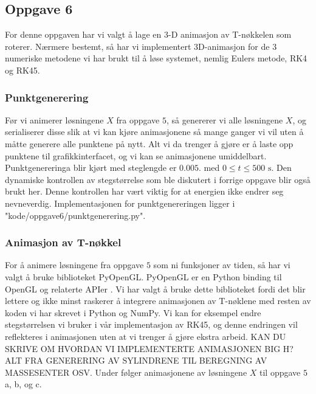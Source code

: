 \subsection{Oppgave 6}
For denne oppgaven har vi valgt å lage en 3-D animasjon av T-nøkkelen som roterer. Nærmere bestemt, så har vi implementert 3D-animasjon for de $3$ numeriske metodene vi har brukt til å løse systemet, nemlig Eulers metode, RK4 og RK45.

\subsubsection{Punktgenerering}
Før vi animerer løsningene $X$ fra oppgave $5$, så genererer vi alle løsningene $X$, og serialiserer disse slik at vi kan kjøre animasjonene så mange ganger vi vil uten å måtte generere alle punktene på nytt. Alt vi da trenger å gjøre er å laste opp punktene til grafikkinterfacet, og vi kan se animasjonene umiddelbart. Punktgenereringa blir kjørt med steglengde er $0.005.$ med $0\leq t \leq 500\text{ s}.$ Den dynamiske kontrollen av stegstørrelse som ble diskutert i forrige oppgave blir også brukt her. Denne kontrollen har vært viktig for at energien ikke endrer seg nevneverdig. Implementasjonen for punktgenereringen ligger i "kode/oppgave6/punktgenerering.py".

\subsubsection{Animasjon av T-nøkkel}
For å animere løsningene fra oppgave $5$ som ni funksjoner av tiden, så har vi valgt å bruke biblioteket PyOpenGL. PyOpenGL er en Python binding til OpenGL og relaterte APIer \cite{PYOPENGL:1}. Vi har valgt å bruke dette biblioteket fordi det blir lettere og ikke minst raskerer å integrere animasjonen av T-nøklene med resten av koden vi har skrevet i Python og NumPy. Vi kan for eksempel endre stegstørrelsen vi bruker i vår implementasjon av RK45, og denne endringen vil reflekteres i animasjonen uten at vi trenger å gjøre ekstra arbeid.\newline\newline
KAN DU SKRIVE OM HVORDAN VI IMPLEMENTERTE ANIMASJONEN BIG H? ALT FRA GENERERING AV SYLINDRENE TIL BEREGNING AV MASSESENTER OSV.\newline\newline
Under følger animasjonene av løsningene $X$ til oppgave $5$ a, b, og c.

